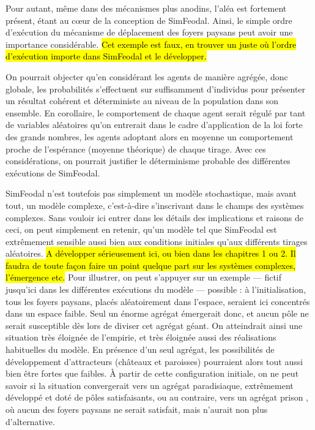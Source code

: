 	Pour autant, même dans des mécanismes plus anodins, l'aléa est fortement présent, étant au cœur de la conception de SimFeodal.
	Ainsi, le simple ordre d'exécution du mécanisme de déplacement des foyers paysans peut avoir une importance considérable.
	\hl{Cet exemple est faux, en trouver un juste où l'ordre d'exécution importe dans SimFeodal et le développer.}

	On pourrait objecter qu'en considérant les agents de manière agrégée, donc globale, les probabilités s'effectuent sur suffisamment d'individus pour présenter un résultat cohérent et déterministe au niveau de la population dans son ensemble.
	En corollaire, le comportement de chaque agent serait régulé par tant de variables aléatoires qu'on entrerait dans le cadre d'application de la loi forte des grands nombres, les agents adoptant alors en moyenne un comportement proche de l'espérance (moyenne théorique) de chaque tirage.
	Avec ces considérations, on pourrait justifier le déterminisme probable des différentes exécutions de SimFeodal.

	SimFeodal n'est toutefois pas simplement un modèle stochastique, mais avant tout, un modèle complexe, c'est-à-dire s'inscrivant dans le champs des systèmes complexes. Sans vouloir ici entrer dans les détails des implications et raisons de ceci, on peut simplement en retenir, qu'un modèle tel que SimFeodal est extrêmement sensible aussi bien aux conditions initiales qu'aux différents tirages aléatoires.
	\hl{A développer sérieusement ici, ou bien dans les chapitres 1 ou 2. Il faudra de toute façon faire un point quelque part sur les systèmes complexes, l'émergence etc.}
	Pour illustrer, on peut s'appuyer sur un exemple ---
	fictif jusqu'ici dans les différentes exécutions du modèle
	--- possible : à l'initialisation, tous les foyers paysans, placés aléatoirement dans l'espace, seraient ici concentrés dans un espace faible.
	Seul un énorme agrégat émergerait donc, et aucun pôle ne serait susceptible dès lors de diviser cet agrégat géant.
	On atteindrait ainsi une situation très éloignée de l'empirie, et très éloignée aussi des réalisations habituelles du modèle.
	En présence d'un seul agrégat, les possibilités de développement d'attracteurs (châteaux et paroisses) pourraient alors tout aussi bien être fortes que faibles.
	À partir de cette configuration initiale, on ne peut savoir si la situation convergerait vers un agrégat \og paradisiaque\fg{}, extrêmement développé et doté de pôles satisfaisants, ou au contraire, vers un agrégat \og prison \fg{}, où aucun des foyers paysans ne serait satisfait, mais n'aurait non plus d'alternative.


